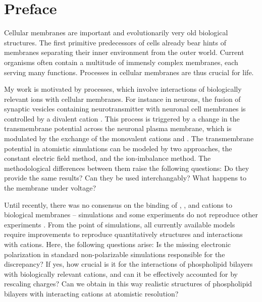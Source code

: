 \chapter*{Preface}

Cellular membranes are important and evolutionarily very old biological structures. 
\citep{MolBiolCell} 
The first primitive predecessors of cells already bear hints of membranes 
separating their inner environment from the outer world. 
Current organisms often contain a multitude of immensly complex membranes, 
each serving many functions. 
Processes in cellular membranes are thus crucial for life. 

My work is motivated by processes,
which involve interactions of biologically relevant ions with cellular membranes. 
For instance in neurons, 
the fusion of synaptic vesicles containing neurotransmitter with neuronal cell membranes 
is controlled by a divalent cation . \citep{Berridge2003, Clapham2007}
This process is triggered by a change in 
the transmembrane potential across the neuronal plasma membrane,
which is modulated by the exchange of the monovalent cations  and . \citep{Knudsen_book2002}
The transmembrane potential in atomistic simulations can be modeled by two approaches, 
the constant electric field method, 
and the ion-imbalance method. 
The methodological differences between them raise the following questions:
Do they provide the same results? 
Can they be used interchangably?
What happens to the membrane under voltage?

Until recently,
there was no consensus on the binding of 
, , and  cations
to biological membranes -- 
simulations and some experiments   \citep{berkowitz12, vacha09a, harb13}
do not reproduce other experiments \citep{roux90, pabst07, akutsu81}. 
From the point of simulations,
all currently available models 
require improvements to reproduce quantitatively structures and interactions with cations. 
Here, the following questions arise:
Is the missing electronic polarization in standard non-polarizable simulations responsible for the discrepancy?
If yes, how crucial is it for the interactions of phospholipid bilayers with biologically relevant cations,
and can it be effectively accounted for by rescaling charges?
Can we obtain in this way realistic structures of phospholipid bilayers with interacting cations at atomistic resolution?


